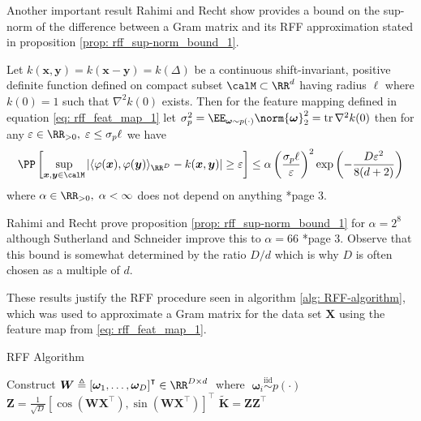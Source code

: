 Another important result Rahimi and Recht show provides a bound on the sup-norm of the difference between a Gram matrix and its RFF approximation stated in proposition \ref{prop: rff_sup-norm_bound_1}.

\begin{prop} \label{prop: rff_sup-norm_bound_1}
    Let $k(\bm{x} , \bm{y}) = k(\bm{x} - \bm{y}) = k( \Delta)$ be a continuous shift-invariant, positive definite function defined on compact subset $\calM \subset \RR^d$ having radius $\ell$ where $k(0) = 1$ such that $\nabla^2 k(0)$ exists. Then for the feature mapping defined in equation \ref{eq: rff_feat_map_1} let $\sigma_p^2 = \EE_{\bm{\omega} \sim p(\cdot)} \norm{\bm{\omega}}^2_2 = \operatorname{tr} \nabla^2 k(0)$ then for any $\varepsilon \in \RR_{>0}, \; \varepsilon \leq \sigma_p \ell$ we have
    \[
        \PP \left[ \sup_{\bm{x},\bm{y} \in \calM} \left| \langle \varphi (\bm{x}) , \varphi (\bm{y}) \rangle_{\RR^D} - k (\bm{x},\bm{y}) \right| \geq \varepsilon \right] \leq \alpha \left( \frac{\sigma_p \ell}{\varepsilon} \right)^2 \exp \left( - \frac{D \varepsilon^2}{8(d+2)} \right)
    \]
    where $\alpha \in \RR_{>0}, \; \alpha < \infty$ does not depend on anything \cite{NIPS2007_013a006f}*{page 3}.
\end{prop}

Rahimi and Recht prove proposition \ref{prop: rff_sup-norm_bound_1} for $\alpha = 2^8$ although Sutherland and Schneider improve this to $\alpha = 66$ \cite{sutherland2015error}*{page 3}. Observe that this bound is somewhat determined by the ratio $D/d$ which is why $D$ is often chosen as a multiple of $d$.

These results justify the RFF procedure seen in algorithm \ref{alg: RFF-algorithm}, which was used to approximate a Gram matrix for the data set $\bm{X}$ using the feature map from \ref{eq: rff_feat_map_1}.

{\centering
\begin{minipage}{.85\linewidth}
    \begin{algorithm}[H]
        \caption{RFF Algorithm}
        \label{alg: RFF-algorithm}
        \SetAlgoLined
        \DontPrintSemicolon

        \BlankLine
        Construct $\bm{W} \triangleq \left[ \bm{\omega}_1 ,\ldots , \bm{\omega}_D \right]^{\intercal} \in \RR^{D \times d} \;$ where $\; \bm{\omega}_i \stackrel{\text{iid}}{\sim} p(\cdot)$\;
        $\bm{Z} = \frac{1}{\sqrt{D}} \left[ \cos \left( \bm{W} \bm{X}^{\intercal} \right), \sin \left( \bm{W} \bm{X}^{\intercal} \right) \right]^{\intercal}$\;
        $\bm{\widetilde{K}} = \bm{Z}\bm{Z}^{\intercal}$\;
        \BlankLine
    \end{algorithm}
\end{minipage}
\par
}

